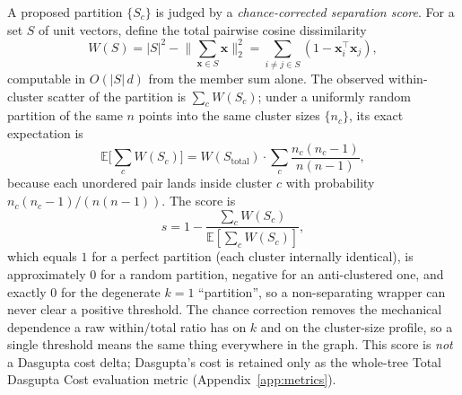 A proposed partition $\{S_c\}$ is judged by a \emph{chance-corrected separation score}.
For a set $S$ of unit vectors, define the total pairwise cosine dissimilarity
\[
W(S) = |S|^2 - \Big\|\sum_{\mathbf{x} \in S} \mathbf{x}\Big\|_2^2
= \sum_{i \neq j \in S} \left(1 - \mathbf{x}_i^\top \mathbf{x}_j\right),
\]
computable in $O(|S|\,d)$ from the member sum alone.
The observed within-cluster scatter of the partition is $\sum_c W(S_c)$; under a
uniformly random partition of the same $n$ points into the same cluster sizes $\{n_c\}$,
its exact expectation is
\[
\mathbb{E}\Big[\sum_c W(S_c)\Big]
= W(S_{\text{total}}) \cdot
\sum_c \frac{n_c (n_c - 1)}{n (n - 1)},
\]
because each unordered pair lands inside cluster $c$ with probability
$n_c(n_c-1)/(n(n-1))$.
The score is
\[
s = 1 - \frac{\sum_c W(S_c)}
{\mathbb{E}\left[\sum_c W(S_c)\right]},
\]
which equals $1$ for a perfect partition (each cluster internally identical), is
approximately $0$ for a random partition, negative for an anti-clustered one, and exactly
$0$ for the degenerate $k = 1$ ``partition'', so a non-separating wrapper can never clear
a positive threshold.
The chance correction removes the mechanical dependence a raw within/total ratio has on
$k$ and on the cluster-size profile, so a single threshold means the same thing
everywhere in the graph.
This score is \emph{not} a Dasgupta cost delta; Dasgupta's cost
\parencite{dasgupta2016cost} is retained only as the whole-tree Total Dasgupta Cost
evaluation metric (Appendix~\ref{app:metrics}).

